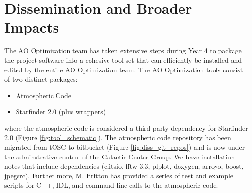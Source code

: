 \section{Dissemination and Broader Impacts}
\label{sec:dissemination}

The AO Optimization team has taken extensive steps during Year 4 to 
package the project software into a cohesive tool set that can
efficiently be installed and edited by the entire AO Optimization
team. The AO Optimization tools consist of two distinct packages:
\begin{itemize}
\item Atmospheric Code
\item Starfinder 2.0 (plus wrappers)
\end{itemize}
where the atmospheric code is considered a third party dependency for
Starfinder 2.0 (Figure \ref{fig:tool_schematic}).
The atmospheric code repository has been migrated from tOSC to
bitbucket (Figure \ref{fig:diss_git_repos}) and is now under the
adminstrative control of the Galactic Center Group. We have
installation notes that include dependencies (cfitsio, fftw-3.3,
plplot, doxygen, arroyo, boost, jpegsrc). Further more, M. Britton has
provided a series of test and example scripts for C++, IDL, and
command line calls to the atmospheric code. 

